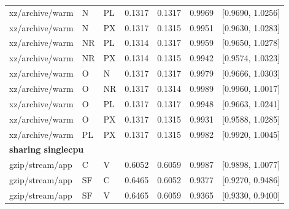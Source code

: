 \begin{longtable}{lllrrrr}
xz/archive/warm & N & PL & 0.1317 & 0.1317 & 0.9969 & [0.9690, 1.0256] \\
xz/archive/warm & N & PX & 0.1317 & 0.1315 & 0.9951 & [0.9630, 1.0283] \\
xz/archive/warm & NR & PL & 0.1314 & 0.1317 & 0.9959 & [0.9650, 1.0278] \\
xz/archive/warm & NR & PX & 0.1314 & 0.1315 & 0.9942 & [0.9574, 1.0323] \\
xz/archive/warm & O & N & 0.1317 & 0.1317 & 0.9979 & [0.9666, 1.0303] \\
xz/archive/warm & O & NR & 0.1317 & 0.1314 & 0.9989 & [0.9960, 1.0017] \\
xz/archive/warm & O & PL & 0.1317 & 0.1317 & 0.9948 & [0.9663, 1.0241] \\
xz/archive/warm & O & PX & 0.1317 & 0.1315 & 0.9931 & [0.9588, 1.0285] \\
xz/archive/warm & PL & PX & 0.1317 & 0.1315 & 0.9982 & [0.9920, 1.0045] \\
\multicolumn{7}{l}{\textbf{sharing singlecpu}} \\
gzip/stream/app & C & V & 0.6052 & 0.6059 & 0.9987 & [0.9898, 1.0077] \\
gzip/stream/app & SF & C & 0.6465 & 0.6052 & 0.9377 & [0.9270, 0.9486] \\
gzip/stream/app & SF & V & 0.6465 & 0.6059 & 0.9365 & [0.9330, 0.9400] \\
\bottomrule
\end{longtable}
